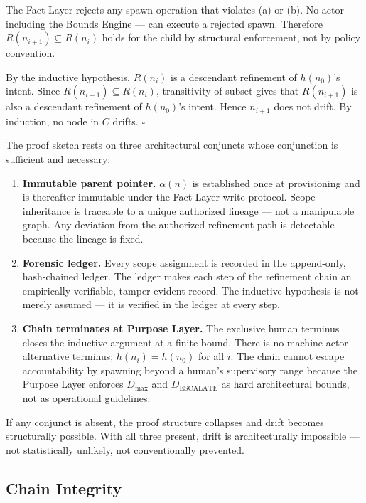 The Fact Layer rejects any spawn operation that violates (a) or (b). No actor --- including the Bounds Engine --- can execute a rejected spawn. Therefore $R(n_{i+1}) \subseteq R(n_i)$ holds for the child by structural enforcement, not by policy convention.

By the inductive hypothesis, $R(n_i)$ is a descendant refinement of $h(n_0)$'s intent. Since $R(n_{i+1}) \subseteq R(n_i)$, transitivity of subset gives that $R(n_{i+1})$ is also a descendant refinement of $h(n_0)$'s intent. Hence $n_{i+1}$ does not drift. By induction, no node in $C$ drifts. $\square$

\medskip
The proof sketch rests on three architectural conjuncts whose conjunction is sufficient and necessary:

\begin{enumerate}
    \item[(1)] \textbf{Immutable parent pointer.} $\alpha(n)$ is established once at provisioning and is thereafter immutable under the Fact Layer write protocol. Scope inheritance is traceable to a unique authorized lineage --- not a manipulable graph. Any deviation from the authorized refinement path is detectable because the lineage is fixed.
    \item[(2)] \textbf{Forensic ledger.} Every scope assignment is recorded in the append-only, hash-chained ledger. The ledger makes each step of the refinement chain an empirically verifiable, tamper-evident record. The inductive hypothesis is not merely assumed --- it is verified in the ledger at every step.
    \item[(3)] \textbf{Chain terminates at Purpose Layer.} The exclusive human terminus closes the inductive argument at a finite bound. There is no machine-actor alternative terminus; $h(n_i) = h(n_0)$ for all $i$. The chain cannot escape accountability by spawning beyond a human's supervisory range because the Purpose Layer enforces $D_{\mathrm{max}}$ and $D_{\mathrm{ESCALATE}}$ as hard architectural bounds, not as operational guidelines.
\end{enumerate}

If any conjunct is absent, the proof structure collapses and drift becomes structurally possible. With all three present, drift is architecturally impossible --- not statistically unlikely, not conventionally prevented.

\subsection{Chain Integrity}
\label{sec:rs-chain-integrity}

